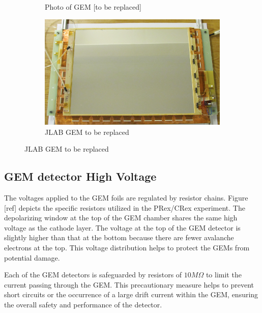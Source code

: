 \begin{figure}
\begin{subfigure}[b]{0.2\textwidth}
         \caption{Photo of GEM [to be replaced]}
         \label{Photo of CEBAF}
     \end{subfigure}
     \hfill
     \begin{subfigure}[b]{0.45\textwidth}
         \centering
         \includegraphics[width=\textwidth]{images/chap3/gem_chamber.png}
         \caption{JLAB GEM to be replaced}
         \label{gem_structure}
     \end{subfigure}
\end{figure}

\subsection{GEM detector High Voltage}

The voltages applied to the GEM foils are regulated by resistor chains. Figure [ref] depicts the specific resistors utilized in the PRex/CRex experiment. The depolarizing window at the top of the GEM chamber shares the same high voltage as the cathode layer. The voltage at the top of the GEM detector is slightly higher than that at the bottom because there are fewer avalanche electrons at the top. This voltage distribution helps to protect the GEMs from potential damage.

Each of the GEM detectors is safeguarded by resistors of $10M\Omega$ to limit the current passing through the GEM. This precautionary measure helps to prevent short circuits or the occurrence of a large drift current within the GEM, ensuring the overall safety and performance of the detector.


